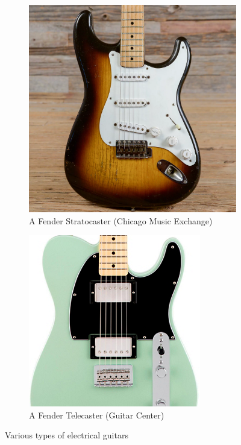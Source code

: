\documentclass{article}
\begin{document}
\begin{figure}[ht]
	\centering
	\begin{subfigure}{.3\textwidth}
		\centering
		\includegraphics[width=.8\linewidth]{img/stratocaster}
		\caption{A Fender Stratocaster (Chicago Music Exchange)}
	\end{subfigure}
	\begin{subfigure}{.3\textwidth}
		\centering
		\includegraphics[width=.8\linewidth]{img/telecaster}
		\caption{A Fender Telecaster (Guitar Center)}
	\end{subfigure}
	\caption{Various types of electrical guitars}
	\label{fig:guitars}
\end{figure}
\end{document}
